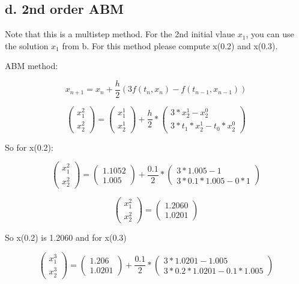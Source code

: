 \documentclass[]{article}
\begin{document}
\subsection{d. 2nd order ABM}\label{d.-2nd-order-abm}

Note that this is a multistep method. For the 2nd initial vlaue \(x_1\),
you can use the solution \(x_1\) from b. For this method please compute
x(0.2) and x(0.3).

ABM method:

\[x_{n+1} = x_n + \frac{h}2(3f(t_n,x_n) - f(t_{n-1}, x_{n-1}))\]

\[
\left(\begin{array}{c} 
x_1^2\\
x_2^2
\end{array}\right)=
\left(\begin{array}{c} 
x_1^1 \\
x_2^1 
\end{array}\right) + \frac{h}2 *
\left(\begin{array}{c}
3 * x_2^1 - x_2^0\\
3 * t_1 * x_2^1 - t_0*x_2^0
\end{array}\right)
\]

So for x(0.2):

\[
\left(\begin{array}{c} 
x_1^2\\
x_2^2
\end{array}\right)=
\left(\begin{array}{c} 
1.1052 \\
1.005 
\end{array}\right) + \frac{0.1}2 *
\left(\begin{array}{c}
3 * 1.005 - 1\\
3 * 0.1 * 1.005 - 0*1
\end{array}\right)
\]

\[
\left(\begin{array}{c} 
x_1^2\\
x_2^2
\end{array}\right)=
\left(\begin{array}{c} 
1.2060 \\
1.0201
\end{array}\right)
\]

So x(0.2) is 1.2060 and for x(0.3)

\[
\left(\begin{array}{c} 
x_1^3\\
x_2^3
\end{array}\right)=
\left(\begin{array}{c} 
1.206 \\
1.0201 
\end{array}\right) + \frac{0.1}2 *
\left(\begin{array}{c}
3 * 1.0201 - 1.005\\
3 * 0.2 * 1.0201 - 0.1*1.005
\end{array}\right)
\]
\end{document}
